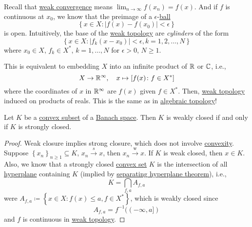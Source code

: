 Recall that \hyperref[def:weakly-convergence]{weak convergence} means \(\lim_{n \to \infty} f(x_n) = f(x)\). And if \(f\) is continuous at \(x_0\), we know that the preimage of a \(\epsilon \)-\hyperref[def:ball]{ball}
\[
	\left\{ x\in X\colon \left\vert f(x) - f(x_0) \right\vert < \epsilon  \right\}
\]
is open. Intuitively, the base of the \hyperref[def:weak-topology]{weak topology} are \emph{cylinders} of the form
\[
	\left\{ x\in X\colon \left\vert f_k(x - x_0) \right\vert < \epsilon , k = 1, 2, \ldots , N \right\}
\]
where \(x_0\in X\), \(f_k\in X^{\ast} \), \(k = 1, \ldots  , N\) for \(\epsilon > 0\), \(N \geq 1\).

\begin{remark}
	This is equivalent to embedding \(X\) into an infinite product of \(\mathbb{\MakeUppercase{r}} \) or \(\mathbb{\MakeUppercase{c}} \), i.e.,
	\[
		X\to \mathbb{\MakeUppercase{r}} ^{\infty} ,\quad x\mapsto \left[ f(x)\colon f\in X^{\ast} \right]
	\]
	where the coordinates of \(x\) in \(\mathbb{\MakeUppercase{r}} ^{\infty} \) are \(f(x)\) given \(f\in X^{\ast} \). Then, \hyperref[def:weak-topology]{weak topology} induced on products of reals. This is the same as in \href{https://www.pbb.wtf/posts/Notes#algebraic-topology-math592-umich}{algebraic topology}!
\end{remark}

\begin{proposition}\label{prop:weak-closedness}
	Let \(K\) be a \hyperref[def:convex-set]{convex subset} of a \hyperref[def:Banach-space]{Banach space}. Then \(K\) is weakly closed if and only if \(K\) is strongly closed.
\end{proposition}
\begin{proof}
	Weak closure implies strong closure, which does not involve \hyperref[def:convex-set]{convexity}. Suppose \(\left\{ x_n \right\} _{n\geq 1}\subseteq K\), \(x_n \overset{s}{\to } x\), then \(x_n \overset{\text{w}}{\to } x\). If \(K\) is weak closed, then \(x\in K\). Also, we know that a strongly closed \hyperref[def:convex-set]{convex set} \(K\) is the intersection of all \hyperref[def:hyperplane]{hyperplane} containing \(K\) (implied by \hyperref[thm:separation-of-convex-sets]{separating hyperplane theorem}), i.e.,
	\[
		K = \bigcap_{f, a} A_{f, a}
	\]
	were \(A_{f, a}\coloneqq \left\{ x\in X \colon f(x) \leq a, f\in X^{\ast} \right\} \), which is weakly closed since
	\[
		A_{f, a}= f^{-1} ((-\infty , a])
	\]
	and \(f\) is continuous in \hyperref[def:weak-topology]{weak topology}.
\end{proof}